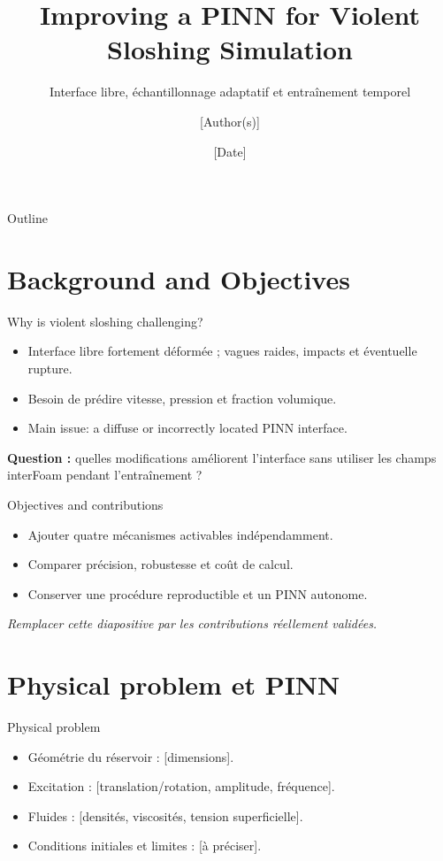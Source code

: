 \documentclass[aspectratio=169,11pt]{beamer}
\title[PINN et ballottement]{Improving a PINN for Violent Sloshing Simulation}
\subtitle{Interface libre, échantillonnage adaptatif et entraînement temporel}
\author{[Author(s)]}
\institute{[Laboratory / institution]}
\date{[Date]}
\begin{document}
\begin{frame}
  \titlepage
\end{frame}

\begin{frame}{Outline}
  \tableofcontents
\end{frame}

\section{Background and Objectives}
\begin{frame}{Why is violent sloshing challenging?}
\begin{itemize}
  \item Interface libre fortement déformée ; vagues raides, impacts et éventuelle rupture.
  \item Besoin de prédire vitesse, pression et fraction volumique.
  \item Main issue: a diffuse or incorrectly located PINN interface.
\end{itemize}
\vspace{0.4cm}
\textbf{Question :} quelles modifications améliorent l'interface sans utiliser les champs interFoam pendant l'entraînement ?
\end{frame}

\begin{frame}{Objectives and contributions}
\begin{itemize}
  \item Ajouter quatre mécanismes activables indépendamment.
  \item Comparer précision, robustesse et coût de calcul.
  \item Conserver une procédure reproductible et un PINN autonome.
\end{itemize}
\textit{Remplacer cette diapositive par les contributions réellement validées.}
\end{frame}

\section{Physical problem et PINN}
\begin{frame}{Physical problem}
\begin{itemize}
  \item Géométrie du réservoir : [dimensions].
  \item Excitation : [translation/rotation, amplitude, fréquence].
  \item Fluides : [densités, viscosités, tension superficielle].
  \item Conditions initiales et limites : [à préciser].
\end{itemize}
\begin{center}
\end{center}
\end{frame}
\end{document}
